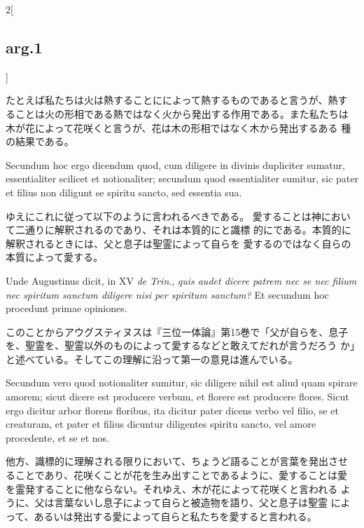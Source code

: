 \documentclass[paper=a4paper,fontsize=10pt,jafontsize=9pt,titlepage]{jlreq}
\begin{document}
\begin{paracol}{2}[\subsection{arg.1}]
\switchcolumn

たとえば私たちは火は熱することにによって熱するものであると言うが、熱す
ることは火の形相である熱ではなく火から発出する作用である。また私たちは
 木が花によって花咲くと言うが、花は木の形相ではなく木から発出するある
 種の結果である。

\switchcolumn*

Secundum hoc ergo dicendum quod, cum diligere in divinis dupliciter
 sumatur, essentialiter scilicet et notionaliter; secundum quod
 essentialiter sumitur, sic pater et filius non diligunt se spiritu
 sancto, sed essentia sua.

\switchcolumn

ゆえにこれに従って以下のように言われるべきである。
愛することは神において二通りに解釈されるのであり、それは本質的にと識標
 的にである。本質的に解釈されるときには、父と息子は聖霊によって自らを
 愛するのではなく自らの本質によって愛する。

\switchcolumn*

Unde Augustinus dicit, in XV {\itshape de Trin}., {\itshape quis
 audet dicere patrem nec se nec filium nec spiritum sanctum diligere
 nisi per spiritum sanctum?} Et secundum hoc procedunt primae
 opiniones.

\switchcolumn

このことからアウグスティヌスは『三位一体論』第15巻で「父が自らを、息子
 を、聖霊を、聖霊以外のものによって愛するなどと敢えてだれが言うだろう
 か」と述べている。そしてこの理解に沿って第一の意見は進んでいる。

\switchcolumn*

Secundum vero quod notionaliter sumitur, sic diligere
 nihil est aliud quam spirare amorem; sicut dicere est producere
 verbum, et florere est producere flores. Sicut ergo dicitur arbor
 florens floribus, ita dicitur pater dicens verbo vel filio, se et
 creaturam, et pater et filius dicuntur diligentes spiritu sancto, vel
 amore procedente, et se et nos.

\switchcolumn

他方、識標的に理解される限りにおいて、ちょうど語ることが言葉を発出させ
ることであり、花咲くことが花を生み出すことであるように、愛することは愛
 を霊発することに他ならない。それゆえ、木が花によって花咲くと言われる
 ように、父は言葉ないし息子によって自らと被造物を語り、父と息子は聖霊
 によって、あるいは発出する愛によって自らと私たちを愛すると言われる。

\switchcolumn*[\subsection{ad.1}]


\end{paracol}
\end{document}
